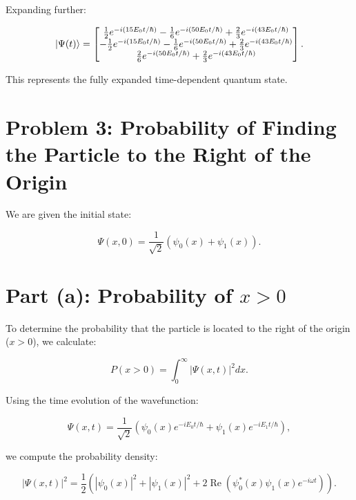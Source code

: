 \documentclass[12pt]{article}
\begin{document}
Expanding further:

\begin{equation}
    \ket{\Psi(t)} =
    \begin{bmatrix}
        \frac{1}{2} e^{-i (15E_0 t / \hbar)} - \frac{1}{6} e^{-i (50E_0 t / \hbar)} + \frac{2}{3} e^{-i (43E_0 t / \hbar)} \\
        -\frac{1}{2} e^{-i (15E_0 t / \hbar)} - \frac{1}{6} e^{-i (50E_0 t / \hbar)} + \frac{2}{3} e^{-i (43E_0 t / \hbar)} \\
        \frac{2}{6} e^{-i (50E_0 t / \hbar)} + \frac{2}{3} e^{-i (43E_0 t / \hbar)}
    \end{bmatrix}.
\end{equation}

This represents the fully expanded time-dependent quantum state.






\section*{Problem 3: Probability of Finding the Particle to the Right of the Origin}

We are given the initial state:

\begin{equation}
    \Psi(x,0) = \frac{1}{\sqrt{2}} \left( \psi_0(x) + \psi_1(x) \right).
\end{equation}

\section*{Part (a): Probability of \( x > 0 \)}

To determine the probability that the particle is located to the right of the origin ($x > 0$), we calculate:

\begin{equation}
    P(x > 0) = \int_{0}^{\infty} |\Psi(x,t)|^2 dx.
\end{equation}

Using the time evolution of the wavefunction:

\begin{equation}
    \Psi(x,t) = \frac{1}{\sqrt{2}} \left( \psi_0(x) e^{-i E_0 t / \hbar} + \psi_1(x) e^{-i E_1 t / \hbar} \right),
\end{equation}

we compute the probability density:

\begin{equation}
    |\Psi(x,t)|^2 = \frac{1}{2} \left( |\psi_0(x)|^2 + |\psi_1(x)|^2 + 2 \operatorname{Re} \left( \psi_0^*(x) \psi_1(x) e^{-i \omega t} \right) \right).
\end{equation}
\end{document}
